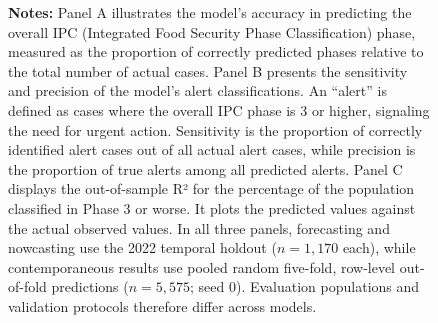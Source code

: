 \documentclass[pdflatex,sn-mathphys-num]{sn-jnl}%
\theoremstyle{thmstyleone}%
\theoremstyle{thmstyletwo}%
\theoremstyle{thmstylethree}%
\begin{document}
\begin{figure}[htbp]
    \begin{minipage}{0.95\textwidth}
    \footnotesize  %
    \textbf{Notes:}
        Panel A illustrates the model’s accuracy in predicting the overall IPC (Integrated Food Security Phase Classification) phase, measured as the proportion of correctly predicted phases relative to the total number of actual cases. Panel B presents the sensitivity and precision of the model’s alert classifications. An “alert” is defined as cases where the overall IPC phase is 3 or higher, signaling the need for urgent action. Sensitivity is the proportion of correctly identified alert cases out of all actual alert cases, while precision is the proportion of true alerts among all predicted alerts. Panel C displays the out-of-sample R² for the percentage of the population classified in Phase 3 or worse. It plots the predicted values against the actual observed values. In all three panels, forecasting and nowcasting use the 2022 temporal holdout ($n=1{,}170$ each), while contemporaneous results use pooled random five-fold, row-level out-of-fold predictions ($n=5{,}575$; seed 0). Evaluation populations and validation protocols therefore differ across models.
    \end{minipage}
\end{figure}



\newpage
\clearpage
\end{document}
